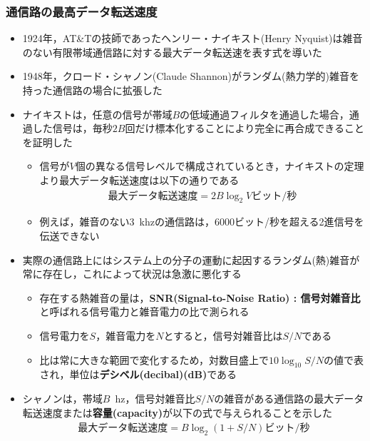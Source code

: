 \documentclass[a4paper]{ltjsarticle}
\begin{document}
    \subsubsection{通信路の最高データ転送速度}
      \begin{itemize}
        \item 1924年，AT\&Tの技師であったヘンリー・ナイキスト(Henry Nyquist)は雑音のない有限帯域通信路に対する最大データ転送速を表す式を導いた
        \item 1948年，クロード・シャノン(Claude Shannon)がランダム(熱力学的)雑音を持った通信路の場合に拡張した
        \item ナイキストは，任意の信号が帯域$B$の低域通過フィルタを通過した場合，通過した信号は，毎秒$2B$回だけ標本化することにより完全に再合成できることを証明した
        \begin{itemize}
          \item 信号が$V$個の異なる信号レベルで構成されているとき，ナイキストの定理より最大データ転送速度は以下の通りである
            \begin{align}
              \text{最大データ転送速度} = 2B \log_2 V \text{ビット/秒}
            \end{align}
          \item 例えば，雑音のない\SI{3}{khz}の通信路は，6000ビット/秒を超える2進信号を伝送できない
        \end{itemize}
        \item 実際の通信路上にはシステム上の分子の運動に起因するランダム(熱)雑音が常に存在し，これによって状況は急激に悪化する
        \begin{itemize}
          \item 存在する熱雑音の量は，\textbf{SNR(Signal-to-Noise Ratio) : 信号対雑音比}と呼ばれる信号電力と雑音電力の比で測られる
          \item 信号電力を$S$，雑音電力を$N$とすると，信号対雑音比は$S/N$である
          \item 比は常に大きな範囲で変化するため，対数目盛上で$10 \log_10 S/N$の値で表され，単位は\textbf{デシベル(decibal)(dB)}である
        \end{itemize}
        \item シャノンは，帯域$B$\SI{}{hz}，信号対雑音比$S/N$の雑音がある通信路の最大データ転送速度または\textbf{容量(capacity)}が以下の式で与えられることを示した
          \begin{align}
            \text{最大データ転送速度} = B \log_2 (1+S/N) \text{ビット/秒}
          \end{align}
      \end{itemize}
\end{document}
